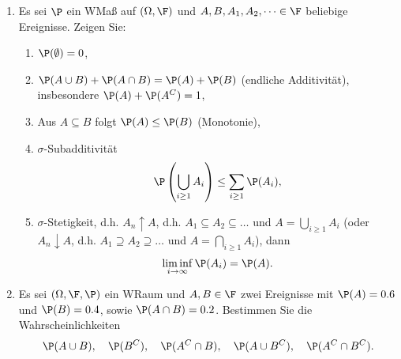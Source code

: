 \begin{enumerate}
	\item Es sei $\P$ ein WMaß auf $(\Omega, \F)$ und $A,B,A_1,A_2,\dots \in \F$ beliebige Ereignisse. Zeigen Sie:
	\begin{enumerate}
		\item $\P(\emptyset) = 0$,
		\item $\P(A\cup B) + \P(A\cap B) = \P(A) + \P(B)$ (endliche Additivität), insbesondere $\P(A) + \P(A^C) = 1$,
		\item Aus $A \subseteq B$ folgt $\P(A) \le \P(B)$ (Monotonie),
		\item $\sigma$-Subadditivität
		\begin{align*}
			\P\left( \bigcup_{i \ge 1} A_i\right) \le \sum_{i\ge 1} \P(A_i),
		\end{align*}
		\item $\sigma$-Stetigkeit, d.h. $A_n \uparrow A$, d.h. $A_1 \subseteq A_2 \subseteq \dots$ und $A = \bigcup_{i \ge 1} A_i$ (oder $A_n \downarrow A$, d.h. $A_1 \supseteq A_2 \supseteq \dots$ und $A = \bigcap_{i \ge 1} A_i$), dann
		\begin{align*}
			\liminf_{i \to \infty} \P(A_i) = \P(A).
		\end{align*}
	\end{enumerate}
	\item Es sei $(\Omega, \F, \P)$ ein WRaum und $A,B \in \F$ zwei Ereignisse mit $\P(A) = 0.6$ und $\P(B) = 0.4$, sowie $\P(A\cap B) = 0.2$. Bestimmen Sie die Wahrscheinlichkeiten
	\begin{align*}
		\P(A\cup B), \quad \P(B^C), \quad \P(A^C \cap B), \quad \P(A \cup B^C), \quad \P(A^C \cap B^C).
	\end{align*}
\end{enumerate}

